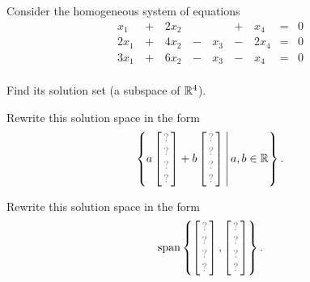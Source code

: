 \begin{activity}{10}
Consider the homogeneous system of equations
\begin{alignat*}{5}
x_1&\,+\,&2x_2&\,\,& &\,+\,& x_4 &=& 0 \\
2x_1&\,+\,&4x_2&\,-\,&x_3 &\,-\,&2 x_4 &=& 0 \\
3x_1&\,+\,&6x_2&\,-\,&x_3 &\,-\,& x_4 &=& 0 \\
\end{alignat*}
\begin{subactivity}
Find its solution set (a subspace of \(\mathbb{R}^4\)).
\end{subactivity}
\begin{subactivity}
Rewrite this solution space in the form \[\setBuilder{ a \begin{bmatrix} \unknown \\ \unknown \\ \unknown \\ \unknown\end{bmatrix} + b \begin{bmatrix} \unknown \\ \unknown \\ \unknown \\ \unknown \end{bmatrix} }{a,b \in \IR}.\]
\end{subactivity}
\begin{subactivity}
Rewrite this solution space in the form \[\vspan\left\{\begin{bmatrix} \unknown \\ \unknown \\ \unknown \\ \unknown\end{bmatrix}, \begin{bmatrix} \unknown \\ \unknown \\ \unknown \\ \unknown \end{bmatrix}\right\}.\]
\end{subactivity}
\end{activity}

